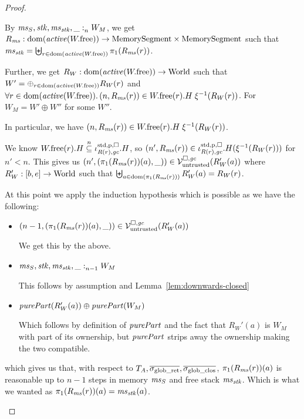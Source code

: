 \documentclass[a4paper]{article}
\begin{document}
\begin{proof}
\begin{itemize}
    By $\memSat{\ms_S,\stk,\ms_\stk,\_}{W_M}$, we get $R_\ms : \dom(\activeReg{\pwfree}) \fun \MemSeg \times \MemSeg$ such that $\ms_\stk = \biguplus_{r \in \dom(\activeReg{\pwfree})} \pi_1(R_\ms(r))$.
    
    Further, we get $R_W : \dom(\activeReg{\pwfree}) \fun \World$ such that $W' = \oplus_{r \in \dom(\activeReg{\pwfree})} R_W(r)$ and $\forall r \in \dom(\activeReg{\pwfree}) \ldotp \npair{R_\ms(r)} \in \pwfree(r).H \; \xi^{-1}(R_W(r))$.
    For $W_M = W' \oplus W''$ for some $W''$.

    In particular, we have $\npair{R_\ms(r)} \in \pwfree(r).H \; \xi^{-1}(R_W(r))$.
    
    We know $\pwfree(r).H \nsubeq \stdreg{R(r),\gc}{\pur}.H$, so $\npair[n']{R_\ms(r)} \in \stdreg{R(r),\gc}{\pur}.H(\xi^{-1}(R_W(r)))$ for $n' < n$.
    This gives us $\npair[n']{(\pi_1(R_\ms(r))(a),\_)} \in \lrv(R_W'(a))$ where $R_W' : [b,e] \fun \World$ such that $\biguplus_{a \in \dom(\pi_1(R_\ms(r)))} R_W'(a) = R_W(r)$.

    At this point we apply the induction hypothesis which is possible as we have
    the following:
    \begin{itemize}
    \item $\npair[n-1]{(\pi_1(R_\ms(r))(a),\_)} \in \lrv(R_W'(a))$

      We get this by the above.
    \item $\memSat[n-1]{\ms_S,\stk,\ms_\stk,\_}{W_M}$

      This follows by assumption and Lemma~\ref{lem:downwards-closed}
    \item $\purePart{R_W'(a)} \oplus \purePart{W_M}$

      Which follows by definition of $\purePart{}$ and the fact that $R_W'(a)$ is $W_M$ with part of its ownership, but $\purePart{}$ strips away the ownership making the two compatible.
    \end{itemize}
    which gives us that, with respect to $\ta,\gsigrets,\gsigcloss$, $\pi_1(R_\ms(r))(a)$ is reasonable up to $n-1$ steps in memory $\ms_S$ and free stack $\ms_\stk$.
    Which is what we wanted as $\pi_1(R_\ms(r))(a) = \ms_\stk(a)$.
  \end{itemize}
\end{proof}
\end{document}
